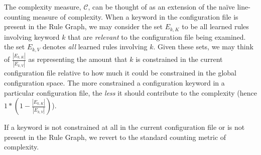 
The complexity measure, $\mathcal{C}$, can be thought of as an
extension of the na\"ive line-counting measure of complexity.
When a keyword in the configuration file is present in the Rule Graph,
we may consider the set $E_{k, K}$ to be all learned rules involving
keyword $k$ that
are {\it relevant} to the configuration file being examined. the set
$E_{k, V}$ denotes {\it all} learned rules involving $k$.
Given these sets, we may think of $\frac{|E_{k, K}|}{|E_{k, V}|}$
as representing the amount that $k$ is constrained in the current
configuration file relative to how much it could be constrained
in the global configuration space. The more constrained a configuration
keyword in a particular configuration file, the {\it less} it should
contribute to the complexity (hence $1 * (1 - \frac{|E_{k, K}|}{|E_{k, V}|})$).

If a keyword is not constrained at all in the current configuration
file or is not present in the Rule Graph, we revert to the standard
counting metric of complexity.

